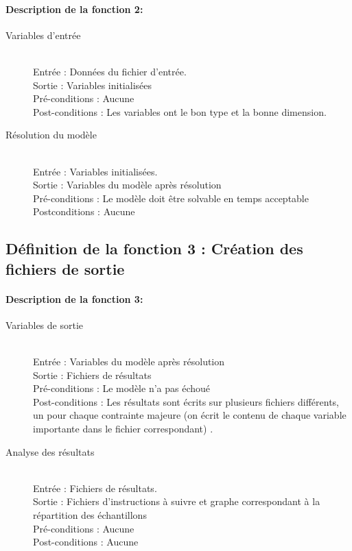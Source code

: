 \documentclass{polytech/polytech}
\numberwithin{figure}{chapter}
\begin{document}
\begin{appendix}
\paragraph{Description de la fonction 2:}

\begin{description}
    \item[Variables d'entrée] ~ \\
        Entrée : Données du fichier d'entrée.\\ 
        Sortie : Variables initialisées\\
        Pré-conditions : Aucune \\
        Post-conditions : Les variables ont le bon type et la bonne dimension.

    \item[Résolution du modèle] ~ \\
        Entrée : Variables initialisées.\\ 
        Sortie : Variables du modèle après résolution\\
        Pré-conditions : Le modèle doit être solvable en temps acceptable\\
        Postconditions : Aucune
\end{description}

\subsection{Définition de la fonction 3 : Création des fichiers de sortie}

\paragraph{Description de la fonction 3:}

\begin{description}
    \item[Variables de sortie] ~ \\
        Entrée : Variables du modèle après résolution\\ 
        Sortie : Fichiers de résultats\\
        Pré-conditions : Le modèle n'a pas échoué \\
        Post-conditions : Les résultats sont écrits sur plusieurs fichiers différents, un pour chaque contrainte majeure (on écrit le contenu de chaque variable importante dans le fichier correspondant) .

    \item[Analyse des résultats] ~ \\
        Entrée : Fichiers de résultats.\\ 
        Sortie : Fichiers d'instructions à suivre et graphe correspondant à la répartition des échantillons \\
        Pré-conditions : Aucune\\
        Post-conditions : Aucune
\end{description}


\end{appendix}
\end{document}
